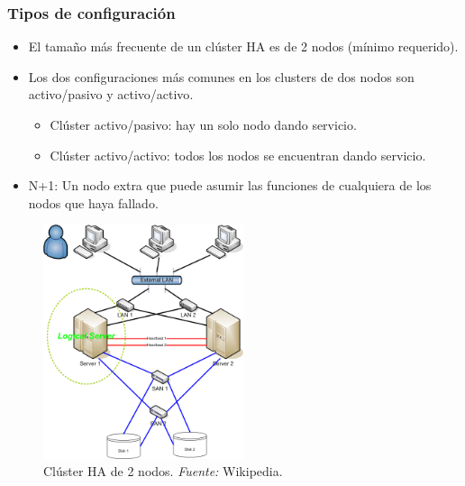 \documentclass{beamer}
\begin{document}

\begin{frame}
\frametitle{Tipos de configuración}

\begin{itemize}
\item El tamaño más frecuente de un clúster HA es de \alert{2} nodos (mínimo requerido).
\item Los dos configuraciones más comunes en los clusters de dos nodos son \alert{activo/pasivo} y \alert{activo/activo}.
	\begin{itemize}
	\item \alert{Clúster activo/pasivo}: hay un solo nodo dando servicio.
	\item \alert{Clúster activo/activo}: todos los nodos se encuentran dando servicio.
	\end{itemize}
\item \alert{N+1}: Un nodo extra que puede asumir las funciones de cualquiera de los nodos que haya fallado.

\end{itemize}

\end{frame}



\begin{frame}

\begin{figure}[h]

\begin{center}
  \centering
  \includegraphics[height=2.7in]{figs/2nodeHAcluster.png}
  \caption{Clúster HA de 2 nodos. \textit{Fuente:} Wikipedia.}
\end{center}
\end{figure}

\end{frame}
\end{document}
